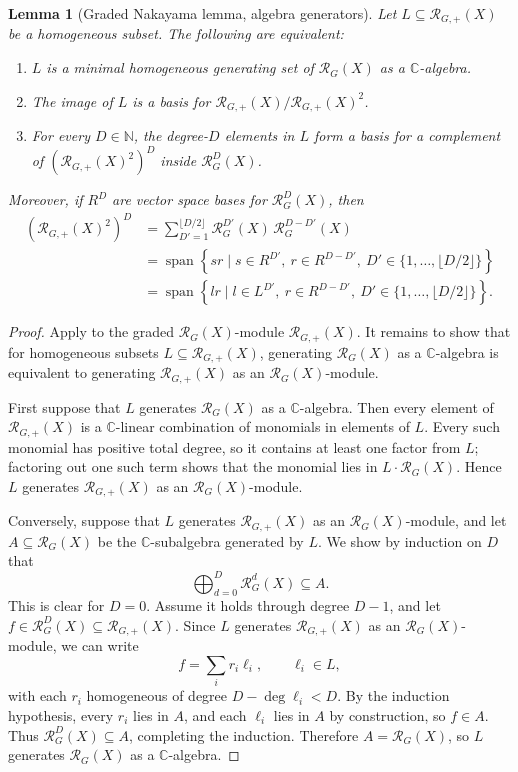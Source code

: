 \documentclass[11pt]{article}
\newcommand{\dsC}{\mathbb{C}}
\newcommand{\dsN}{\mathbb{N}}
\newcommand{\scR}{\mathcal{R}}
\newcommand{\Span}{\operatorname{span}}
\newcommand{\set}[1]{\{#1\}}
\newtheorem{lemma}[theorem]{Lemma}
\theoremstyle{definition}
\begin{document}
\begin{lemma}[Graded Nakayama lemma, algebra generators]\label{lem:algebra-generators}
  Let $L\subseteq \scR_{G,+}(X)$ be a homogeneous subset.
  The following are equivalent:
  \begin{enumerate}[label=\textup{(\roman*)}, leftmargin=2em]
    \item $L$ is a minimal homogeneous generating set of $\scR_G(X)$ as a $\dsC$-algebra.
    \item The image of $L$ is a basis for $\scR_{G,+}(X)\big/\scR_{G,+}(X)^2$.
    \item For every $D\in\dsN$, the degree-$D$ elements in $L$ form a basis for a complement of $\left(\scR_{G,+}(X)^2\right)^D$ inside $\scR_G^D(X)$.
  \end{enumerate}
  Moreover, if $R^D$ are vector space bases for $\scR_G^D(X)$, then
  \[
    \begin{aligned}
      \left(\scR_{G,+}(X)^2\right)^D
      &=
      \sum_{D'=1}^{\lfloor D/2\rfloor} \scR_G^{D'}(X)\,\scR_G^{D-D'}(X) \\
      &=
      \Span\left\{s r \mid s\in R^{D'},\ r\in R^{D-D'},\ D'\in \set{1,\dots,\lfloor D/2\rfloor}\right\} \\
      &=
      \Span\left\{l r \mid l\in L^{D'},\ r\in R^{D-D'},\ D'\in \set{1,\dots,\lfloor D/2\rfloor}\right\}.
    \end{aligned}
  \]
\end{lemma}
\begin{proof}
  Apply \cite[Lemma 10.56.1]{Stacks0EKB} to the graded $\scR_G(X)$-module $\scR_{G,+}(X)$.
  It remains to show that for homogeneous subsets $L\subseteq \scR_{G,+}(X)$, generating $\scR_G(X)$ as a $\dsC$-algebra is equivalent to generating $\scR_{G,+}(X)$ as an $\scR_G(X)$-module.

  First suppose that $L$ generates $\scR_G(X)$ as a $\dsC$-algebra.
  Then every element of $\scR_{G,+}(X)$ is a $\dsC$-linear combination of monomials in elements of $L$.
  Every such monomial has positive total degree, so it contains at least one factor from $L$; factoring out one such term shows that the monomial lies in $L \cdot \scR_G(X)$.
  Hence $L$ generates $\scR_{G,+}(X)$ as an $\scR_G(X)$-module.

  Conversely, suppose that $L$ generates $\scR_{G,+}(X)$ as an $\scR_G(X)$-module, and let $A\subseteq \scR_G(X)$ be the $\dsC$-subalgebra generated by $L$.
  We show by induction on $D$ that
  \[
    \bigoplus_{d=0}^{D} \scR_G^d(X)\subseteq A.
  \]
  This is clear for $D=0$.
  Assume it holds through degree $D-1$, and let $f\in \scR_G^D(X)\subseteq \scR_{G,+}(X)$.
  Since $L$ generates $\scR_{G,+}(X)$ as an $\scR_G(X)$-module, we can write
  \[
    f=\sum_i r_i\ell_i,
    \qquad
    \ell_i\in L,
  \]
  with each $r_i$ homogeneous of degree $D-\deg \ell_i < D$.
  By the induction hypothesis, every $r_i$ lies in $A$, and each $\ell_i$ lies in $A$ by construction, so $f\in A$.
  Thus $\scR_G^D(X)\subseteq A$, completing the induction.
  Therefore $A=\scR_G(X)$, so $L$ generates $\scR_G(X)$ as a $\dsC$-algebra.
\end{proof}
\end{document}
